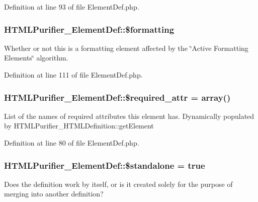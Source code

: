Definition at line 93 of file Element\+Def.\+php.

\hypertarget{classHTMLPurifier__ElementDef_adb1a90d0ca1759f991e69b8e4a7758ce}{
\subsubsection[{\$formatting}]{\setlength{\rightskip}{0pt plus 5cm}H\+T\+M\+L\+Purifier\+\_\+\+Element\+Def\+::\$formatting}}\label{classHTMLPurifier__ElementDef_adb1a90d0ca1759f991e69b8e4a7758ce}
Whether or not this is a formatting element affected by the \char`\"{}\+Active Formatting Elements\char`\"{} algorithm. 

Definition at line 111 of file Element\+Def.\+php.

\hypertarget{classHTMLPurifier__ElementDef_a5a3ba83e55d67a7e20ba6c80ea73aa54}{
\subsubsection[{\$required\+\_\+attr}]{\setlength{\rightskip}{0pt plus 5cm}H\+T\+M\+L\+Purifier\+\_\+\+Element\+Def\+::\$required\+\_\+attr = array()}}\label{classHTMLPurifier__ElementDef_a5a3ba83e55d67a7e20ba6c80ea73aa54}
List of the names of required attributes this element has. Dynamically populated by H\+T\+M\+L\+Purifier\+\_\+\+H\+T\+M\+L\+Definition\+::get\+Element 

Definition at line 80 of file Element\+Def.\+php.

\hypertarget{classHTMLPurifier__ElementDef_a55b9825b6bf0fcf1757d223fe67b2502}{
\subsubsection[{\$standalone}]{\setlength{\rightskip}{0pt plus 5cm}H\+T\+M\+L\+Purifier\+\_\+\+Element\+Def\+::\$standalone = true}}\label{classHTMLPurifier__ElementDef_a55b9825b6bf0fcf1757d223fe67b2502}
Does the definition work by itself, or is it created solely for the purpose of merging into another definition? 

